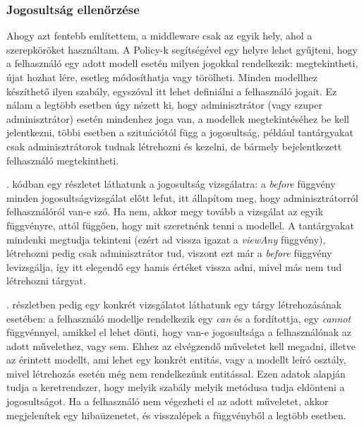 \documentclass[
]{thesis-ekf}
\theoremstyle{definition}
\theoremstyle{remark}
\begin{document}


\subsubsection{Jogosultság ellenőrzése}

Ahogy azt fentebb említettem, a middleware csak az egyik hely, ahol a szerepköröket használtam. A Policy-k\cite{policies} segítségével egy helyre lehet gyűjteni, hogy a felhasználó egy adott modell esetén milyen jogokkal rendelkezik: megtekintheti, újat hozhat lére, esetleg módosíthatja vagy törölheti. Minden modellhez készíthető ilyen szabály, egyszóval itt lehet definiálni a felhasználó jogait. Ez nálam a legtöbb esetben úgy nézett ki, hogy adminisztrátor (vagy szuper adminisztrátor) esetén mindenhez joga van, a modellek megtekintéséhez be kell jelentkezni, többi esetben a szituációtól függ a jogosultság, például tantárgyakat csak adminisztrátorok tudnak létrehozni és kezelni, de bármely bejelentkezett felhasználó megtekintheti.

. kódban egy részletet láthatunk a jogosultság vizsgálatra: a \emph{before} függvény minden jogosultságvizsgálat előtt lefut, itt állapítom meg, hogy adminisztrátorról felhasználóról van-e szó. Ha nem, akkor megy tovább a vizsgálat az egyik függvényre, attól függően, hogy mit szeretnénk tenni a modellel. A tantárgyakat mindenki megtudja tekinteni (ezért ad vissza igazat a \emph{viewAny} függvény), létrehozni pedig csak adminisztrátor tud, viszont ezt már a \emph{before} függvény levizsgálja, így itt elegendő egy hamis értéket vissza adni, mivel más nem tud létrehozni tárgyat.

. részletben pedig egy konkrét vizsgálatot láthatunk egy tárgy létrehozásának esetében: a felhasználó modellje rendelkezik egy \emph{can} és a fordítottja, egy \emph{cannot} függvénnyel, amikkel el lehet dönti, hogy van-e jogosultsága a felhasználónak az adott művelethez, vagy sem. Ehhez az elvégzendő műveletet kell megadni, illetve az érintett modellt, ami lehet egy konkrét entitás, vagy a modellt leíró osztály, mivel létrehozás esetén még nem rendelkezünk entitással. Ezen adatok alapján tudja a keretrendszer, hogy melyik szabály melyik metódusa tudja eldönteni a jogosultságot. Ha a felhasználó nem végezheti el az adott műveletet, akkor megjelenítek egy hibaüzenetet, és visszalépek a függvényből a legtöbb esetben.
\end{document}
